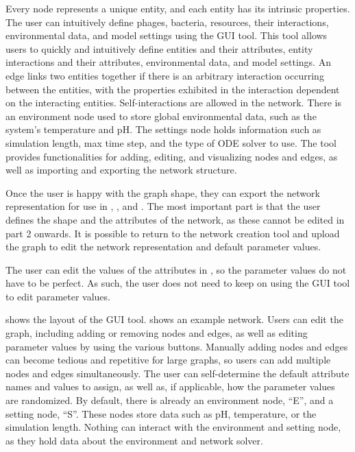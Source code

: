 Every node represents a unique entity, and each entity has its intrinsic properties. 
The user can intuitively define phages, bacteria, resources, their interactions, environmental data, and model settings using the GUI tool. 
This tool allows users to quickly and intuitively define entities and their attributes, entity interactions and their attributes, environmental data, and model settings.
An edge links two entities together if there is an arbitrary interaction occurring between the entities, with the properties exhibited in the interaction dependent on the interacting entities. 
Self-interactions are allowed in the network. 
There is an environment node used to store global environmental data, such as the system's temperature and pH.
The settings node holds information such as simulation length, max time step, and the type of ODE solver to use.
The tool provides functionalities for adding, editing, and visualizing nodes and edges, as well as importing and exporting the network structure.  

Once the user is happy with the graph shape, they can export the network representation for use in , , and . 
The most important part is that the user defines the shape and the attributes of the network, as these cannot be edited in part 2 onwards. 
It is possible to return to the network creation tool and upload the graph to edit the network representation and default parameter values. 

The user can edit the values of the attributes in , so the parameter values do not have to be perfect. 
As such, the user does not need to keep on using the GUI tool to edit parameter values. 

 shows the layout of the GUI tool.  shows an example network. 
Users can edit the graph, including adding or removing nodes and edges, as well as editing parameter values by using the various buttons. 
Manually adding nodes and edges can become tedious and repetitive for large graphs, so users can add multiple nodes and edges simultaneously.
The user can self-determine the default attribute names and values to assign, as well as, if applicable, how the parameter values are randomized. 
By default, there is already an environment node, “E”, and a setting node, “S”.  
These nodes store data such as pH, temperature, or the simulation length.
Nothing can interact with the environment and setting node, as they hold data about the environment and network solver.

